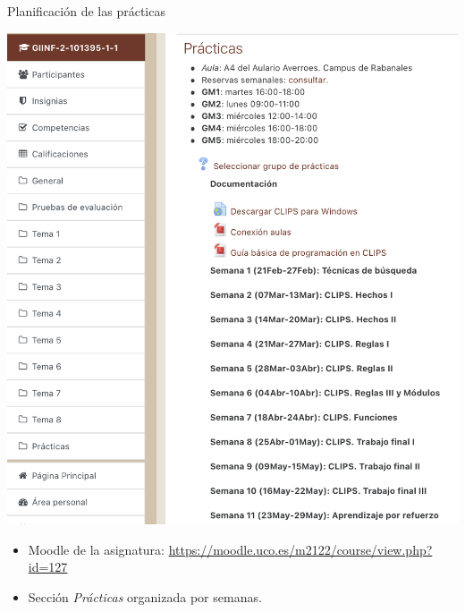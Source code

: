 \documentclass[usenames,dvipsnames,aspectratio=169]{beamer}
\begin{document}
\begin{frame}{Planificación de las prácticas}
	\begin{minipage}{.5\linewidth}
		\includegraphics[width=.9\linewidth]{graphics/moodle.png}
	\end{minipage}
	\begin{minipage}{.45\linewidth}
		\begin{itemize}
			\item Moodle de la asignatura: \url{https://moodle.uco.es/m2122/course/view.php?id=127}
			\item Sección \textit{Prácticas} organizada por semanas.
		\end{itemize}
	\end{minipage}
\end{frame}
\end{document}
